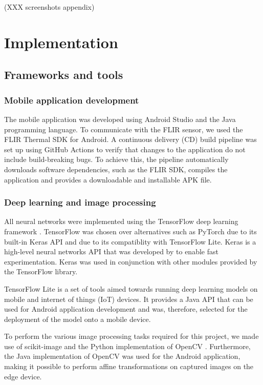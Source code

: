 \documentclass{l4proj}
\begin{document}
(XXX screenshots appendix)

\chapter{Implementation}
\label{implementation}

\section{Frameworks and tools}

\subsection{Mobile application development}

The mobile application was developed using Android Studio and the Java programming language. To communicate with the FLIR sensor, we used the FLIR Thermal SDK for Android. A continuous delivery (CD) build pipeline was set up using GitHub Actions to verify that changes to the application do not include build-breaking bugs. To achieve this, the pipeline automatically downloads software dependencies, such as the FLIR SDK, compiles the application and provides a downloadable and installable APK file.

\subsection{Deep learning and image processing}

All neural networks were implemented using the TensorFlow deep learning framework \citep{abadi_TensorFlow_2016}. TensorFlow was chosen over alternatives such as PyTorch due to its built-in Keras API and due to its compatiblity with TensorFlow Lite. Keras is a high-level neural networks API that was developed by \citet{chollet_keras_2015} to enable fast experimentation. Keras was used in conjunction with other modules provided by the TensorFlow library. 

TensorFlow Lite is a set of tools aimed towards running deep learning models on mobile and internet of things (IoT) devices. It provides a Java API that can be used for Android application development and was, therefore, selected for the deployment of the model onto a mobile device.

To perform the various image processing tasks required for this project, we made use of scikit-image \citep{van_der_walt_scikit-image_2014} and the Python implementation of OpenCV \citep{bradski_opencv_2000}. Furthermore, the Java implementation of OpenCV was used for the Android application, making it possible to perform affine transformations on captured images on the edge device.
\end{document}

